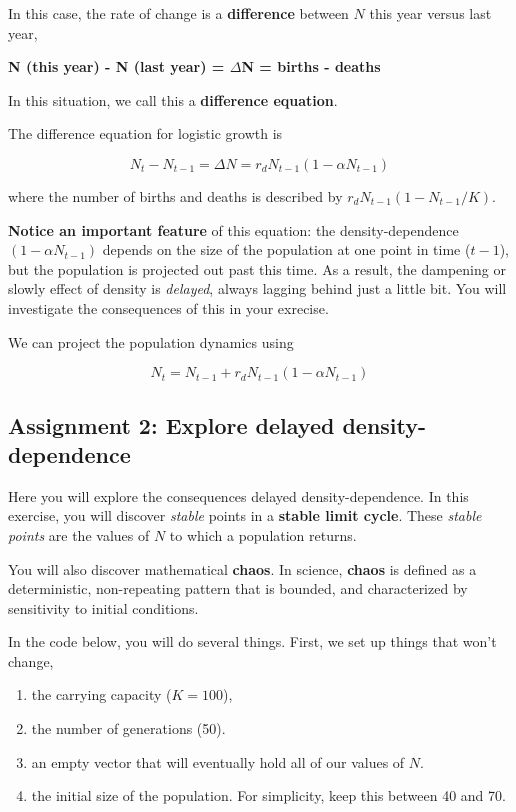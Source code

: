 \documentclass[
  letterpaper,
  DIV=11,
  numbers=noendperiod]{scrreprt}
\providecommand{\tightlist}{%
  \setlength{\itemsep}{0pt}\setlength{\parskip}{0pt}}
\begin{document}
In this case, the rate of change is a \textbf{difference} between \(N\)
this year versus last year,

\textbf{N (this year) - N (last year) = \(\Delta\)N = births - deaths}

In this situation, we call this a \textbf{difference equation}.

The difference equation for logistic growth is

\[N_t - N_{t-1} = \Delta N = r_d N_{t-1}\left(1- \alpha N_{t-1}\right)\]

where the number of births and deaths is described by
\(r_d N_{t-1}\left(1-N_{t-1}/K\right)\).

\textbf{Notice an important feature} of this equation: the
density-dependence \((1-\alpha N_{t-1})\) depends on the size of the
population at one point in time (\(t-1\)), but the population is
projected out past this time. As a result, the dampening or slowly
effect of density is \emph{delayed}, always lagging behind just a little
bit. You will investigate the consequences of this in your exrecise.

We can project the population dynamics using

\[N_t = N_{t-1}  +r_d N_{t-1}\left(1-\alpha N_{t-1}\right)\]

\subsection{Assignment 2: Explore delayed
density-dependence}\label{assignment-2-explore-delayed-density-dependence}

Here you will explore the consequences delayed density-dependence. In
this exercise, you will discover \emph{stable} points in a
\textbf{stable limit cycle}. These \emph{stable points} are the values
of \(N\) to which a population returns.

You will also discover mathematical \textbf{chaos}. In science,
\textbf{chaos} is defined as a deterministic, non-repeating pattern that
is bounded, and characterized by sensitivity to initial conditions.

In the code below, you will do several things. First, we set up things
that won't change,

\begin{enumerate}
\def\labelenumi{\arabic{enumi}.}
\tightlist
\item
  the carrying capacity (\(K=100\)),
\item
  the number of generations (50).
\item
  an empty vector that will eventually hold all of our values of \(N\).
\item
  the initial size of the population. For simplicity, keep this between
  40 and 70.
\end{enumerate}
\end{document}
